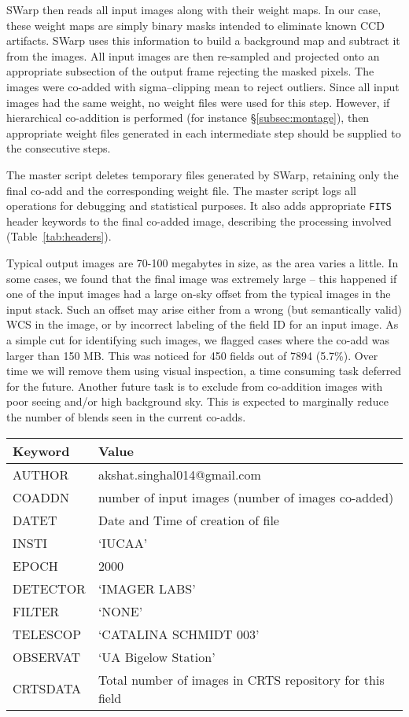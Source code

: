 \documentclass[fleqn,usenatbib]{mnras}
\begin{document}
SWarp then reads all input images along with their weight maps. In our case, these weight maps are simply binary masks intended to eliminate known CCD artifacts. SWarp uses this information to build a background map and subtract it from the images. All input images are then re-sampled and projected onto an appropriate subsection of the output frame rejecting the masked pixels. The images were co-added with sigma--clipping mean to reject outliers. Since all input images had the same weight, no weight files were used for this step. However, if hierarchical co-addition is performed (for instance \S\ref{subsec:montage}), then appropriate weight files generated in each intermediate step should be supplied to the consecutive steps. 

The master script deletes temporary files generated by SWarp, retaining only the final co-add and the corresponding weight file. The master script logs all operations for debugging and statistical purposes. It also adds  appropriate \texttt{FITS} header keywords to the final co-added image, describing the processing involved (Table~\ref{tab:headers}).

Typical output images are 70-100 megabytes in size, as the area varies a little. In some cases, we found that the final image was extremely large -- this happened if one of the input images had a large on-sky offset from the typical images in the input stack. Such an offset may arise either from a wrong (but semantically valid) WCS in the image, or by incorrect labeling of the field ID for an input image. As a simple cut for identifying such images, we flagged cases where the co-add was larger than 150 MB. This was noticed for  450 fields out of 7894 (5.7\%). Over time we will remove them using visual inspection, a time consuming task deferred for the future. Another future task is to exclude from co-addition images with poor seeing and/or high background sky. This is expected to marginally reduce the number of blends seen in the current co-adds.

\begin{table*}
\centering
\begin{tabular}{l|l}
\hline
Keyword & Value\\
\hline
AUTHOR & akshat.singhal014@gmail.com \\
COADDN & number of input images (number of images co-added)\\
DATET & Date and Time of creation of file \\
INSTI & `IUCAA' \\
EPOCH & 2000 \\
DETECTOR & `IMAGER LABS' \\
FILTER & `NONE' \\
TELESCOP & `CATALINA SCHMIDT 003' \\
OBSERVAT & `UA Bigelow Station' \\
CRTSDATA & Total number of images in CRTS repository for this field \\
\hline
\end{tabular}
\caption{Keywords added in the final CSS image co-adds.\label{tab:headers}}
\end{table*}
\end{document}
